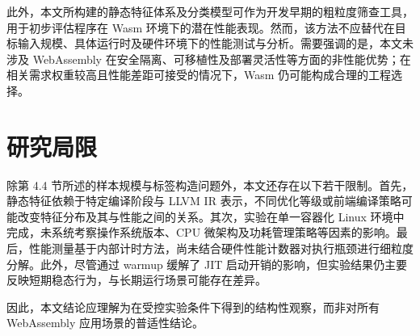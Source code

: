 此外，本文所构建的静态特征体系及分类模型可作为开发早期的粗粒度筛查工具，用于初步评估程序在 Wasm 环境下的潜在性能表现。然而，该方法不应替代在目标输入规模、具体运行时及硬件环境下的性能测试与分析。需要强调的是，本文未涉及 WebAssembly 在安全隔离、可移植性及部署灵活性等方面的非性能优势；在相关需求权重较高且性能差距可接受的情况下，Wasm 仍可能构成合理的工程选择。

\section{研究局限}

除第 4.4 节所述的样本规模与标签构造问题外，本文还存在以下若干限制。首先，静态特征依赖于特定编译阶段与 LLVM IR 表示，不同优化等级或前端编译策略可能改变特征分布及其与性能之间的关系。其次，实验在单一容器化 Linux 环境中完成，未系统考察操作系统版本、CPU 微架构及功耗管理策略等因素的影响。最后，性能测量基于内部计时方法，尚未结合硬件性能计数器对执行瓶颈进行细粒度分解。此外，尽管通过 warmup 缓解了 JIT 启动开销的影响，但实验结果仍主要反映短期稳态行为，与长期运行场景可能存在差异。

因此，本文结论应理解为在受控实验条件下得到的结构性观察，而非对所有 WebAssembly 应用场景的普适性结论。



